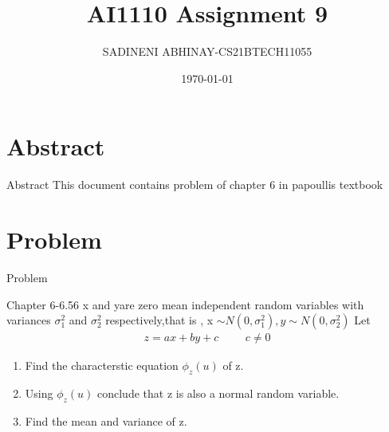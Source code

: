 \documentclass{beamer}
\title{AI1110 Assignment 9}
\author{SADINENI ABHINAY-CS21BTECH11055 }
\date{\today}
\providecommand{\brak}[1]{\ensuremath{\left(#1\right)}}
\begin{document}
\newcommand{\BEQA}{\begin{eqnarray}}
\newcommand{\EEQA}{\end{eqnarray}}
\newcommand{\define}{\stackrel{\triangle}{=}}
\newcommand*\circled[1]{\tikz[baseline=(char.base)]{
    \node[shape=circle,draw,inner sep=2pt] (char) {#1};}}

	\begin{frame}
		\titlepage
	\end{frame}


\section{Abstract}
\begin{frame}{Abstract}
This document contains problem of chapter 6 in papoullis textbook
\end{frame}
\section{Problem}
\begin{frame}{Problem}
\begin{block}{Chapter 6-6.56}
x and yare zero mean independent random variables with variances $\sigma_1^2$ and $\sigma_2^2$ respectively,that is , x $\sim N\brak{0,\sigma_1^2 } ,y\sim N\brak{0,\sigma_2^2}$ Let 
\begin{align}
z=ax+by+c \hspace{1cm} c \neq 0 
\end{align}
\begin{enumerate}
\item Find the characterstic equation $\phi_z \brak{u}$ of z.
\item Using $\phi_z \brak{u}$ conclude that z is also a normal random variable.
\item Find the mean and variance of z.
\end{enumerate}
\end{block}
\end{frame}
\end{document}

